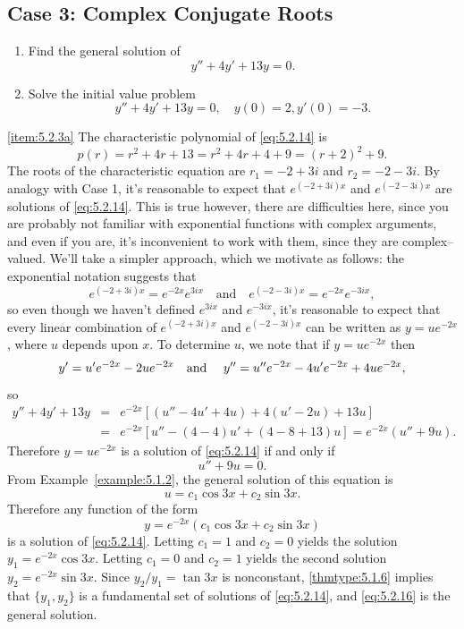 \documentclass{ximera}
\begin{document}
\subsection*{Case 3: Complex Conjugate Roots}

\begin{example}\label{example:5.2.3}
\begin{enumerate}
\item \label{item:5.2.3a}%
Find the general solution of
\begin{equation} \label{eq:5.2.14}
y''+4y'+13y=0.
\end{equation}

\item \label{item:5.2.3b}%
Solve the initial value problem
\begin{equation} \label{eq:5.2.15}
y''+4y'+13y=0, \quad   y(0)=2,  y'(0)=-3.
\end{equation}
\end{enumerate}

\begin{explanation}
\ref{item:5.2.3a} The characteristic
polynomial of
 \eqref{eq:5.2.14} is
$$
p(r)=r^2+4r+13=r^2+4r+4+9=(r+2)^2+9.
$$
The roots of the characteristic equation are $r_1=-2+3i$ and
$r_2=-2-3i$. By analogy with Case 1, it's reasonable to expect that
$e^{(-2+3i)x}$ and $e^{(-2-3i)x}$ are solutions of \eqref{eq:5.2.14}. This
is true %
however, there are
difficulties here, since you are probably not familiar with
exponential functions with complex arguments, and even if you are, it's
 inconvenient to work with them, since they are complex--valued. We'll
 take a simpler approach, which we motivate as follows: the
exponential notation suggests that
$$
e^{(-2+3i)x}=e^{-2x}e^{3ix}\quad\mbox{and}\quad
e^{(-2-3i)x}=e^{-2x}e^{-3ix},
$$
so even though we haven't defined $e^{3ix}$ and $e^{-3ix}$, it's
reasonable to expect that every linear
combination of $e^{(-2+3i)x}$ and $e^{(-2-3i)x}$ can be written as
$y=ue^{-2x}$, where $u$ depends upon $x$. To determine $u$, we note
that if $y=ue^{-2x}$ then
$$
y'=u'e^{-2x}-2ue^{-2x}\mbox{\quad and \quad}
y''=u''e^{-2x}-4u'e^{-2x}+4ue^{-2x},
$$
so
\begin{eqnarray*}
y''+4y'+13y&=&e^{-2x}\left[(u''-4u'+4u)+4(u'-2u)+13u\right]\\
&=&e^{-2x}\left[u''-(4-4)u'+(4-8+13)u\right]=e^{-2x}(u''+9u).
\end{eqnarray*}
Therefore $y=ue^{-2x}$ is a solution of \eqref{eq:5.2.14} if and only if
$$
u''+9u=0.
$$
From Example~\ref{example:5.1.2}, the  general solution of this equation is
$$
u=c_1\cos 3x +c_2\sin 3x.
$$
 Therefore any function of the form
\begin{equation} \label{eq:5.2.16}
y=e^{-2x}(c_1\cos 3x+c_2\sin 3x)
\end{equation}
is  a solution of \eqref{eq:5.2.14}.
Letting $c_1=1$ and $c_2=0$  yields the solution
 $y_1=e^{-2x}\cos3x$. Letting $c_1=0$ and $c_2=1$
yields the second solution $y_2=e^{-2x}\sin3x$. Since
$y_2/y_1=\tan3x$
is nonconstant, \ref{thmtype:5.1.6} implies that   $\{y_1,y_2\}$ is
a fundamental set of solutions of \eqref{eq:5.2.14}, and \eqref{eq:5.2.16}
is the general solution.


\end{explanation}
\end{example}
\end{document}
